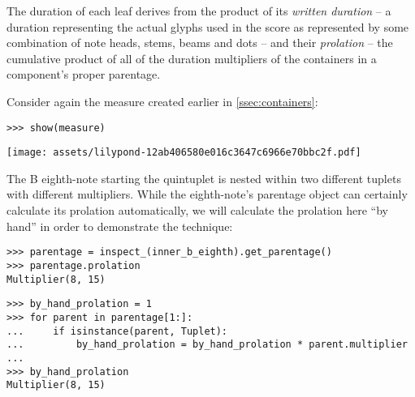 \noindent The duration of each leaf derives from the product of its
\emph{written duration} -- a duration representing the actual glyphs used in
the score as represented by some combination of note heads, stems, beams and
dots -- and their \emph{prolation} -- the cumulative product of all of the
duration multipliers of the containers in a component's proper parentage.

Consider again the measure created earlier in \autoref{ssec:containers}:

\begin{comment}
<abjad>
show(measure)
</abjad>
\end{comment}

\begin{abjadbookoutput}
\begin{singlespacing}
\vspace{-0.5\baselineskip}
\begin{verbatim}
>>> show(measure)
\end{verbatim}
\noindent\texttt{[image: assets/lilypond-12ab406580e016c3647c6966e70bbc2f.pdf]}
\end{singlespacing}
\end{abjadbookoutput}

\noindent The B eighth-note starting the quintuplet is nested within two
different tuplets with different multipliers. While the eighth-note's parentage
object can certainly calculate its prolation automatically, we will calculate
the prolation here \enquote{by hand} in order to demonstrate the technique:

\begin{comment}
<abjad>
parentage = inspect_(inner_b_eighth).get_parentage()
parentage.prolation
by_hand_prolation = 1
for parent in parentage[1:]:
    if isinstance(parent, Tuplet):
        by_hand_prolation = by_hand_prolation * parent.multiplier

by_hand_prolation
</abjad>
\end{comment}

\begin{abjadbookoutput}
\begin{singlespacing}
\vspace{-0.5\baselineskip}
\begin{verbatim}
>>> parentage = inspect_(inner_b_eighth).get_parentage()
>>> parentage.prolation
Multiplier(8, 15)
\end{verbatim}
\begin{verbatim}
>>> by_hand_prolation = 1
>>> for parent in parentage[1:]:
...     if isinstance(parent, Tuplet):
...         by_hand_prolation = by_hand_prolation * parent.multiplier
...
>>> by_hand_prolation
Multiplier(8, 15)
\end{verbatim}
\end{singlespacing}
\end{abjadbookoutput}

